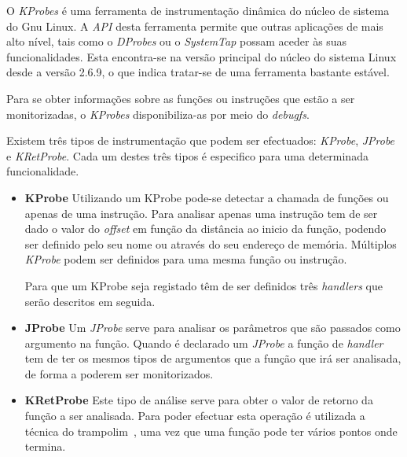 O \textit{KProbes} é uma ferramenta de instrumentação dinâmica do núcleo de sistema do Gnu Linux. A \textit{API} desta ferramenta permite que outras aplicações de mais alto nível, tais como o \textit{DProbes} ou o \textit{SystemTap} possam aceder às suas funcionalidades. Esta encontra-se na versão principal do núcleo do sistema Linux desde a versão 2.6.9, o que indica tratar-se de uma ferramenta bastante estável\cite{kernel_debug_printk_on_fly,KProbesSite}.


Para se obter informações sobre as funções ou instruções que estão a ser monitorizadas, o \textit{KProbes} disponibiliza-as por meio do \textit{debugfs}.

Existem três tipos de instrumentação que podem ser efectuados: \textit{KProbe}, \textit{JProbe} e \textit{KRetProbe}. Cada um destes três tipos é especifico para uma determinada funcionalidade.

\begin{itemize}
 \item \textbf{KProbe}
Utilizando um KProbe pode-se detectar a chamada de funções ou apenas de uma instrução. Para analisar apenas uma instrução tem de ser dado o valor do \textit{offset} em função da distância ao inicio da função, podendo ser definido pelo seu nome ou através do seu endereço de memória. Múltiplos \textit{KProbe} podem ser definidos para uma mesma função ou instrução.

Para que um KProbe seja registado têm de ser definidos três \textit{handlers} que serão descritos em seguida.

\item \textbf{JProbe}
Um \textit{JProbe} serve para analisar os parâmetros que são passados como argumento na função. Quando é declarado um \textit{JProbe} a função de \textit{handler} tem de ter os mesmos tipos de argumentos que a função que irá ser analisada, de forma a poderem ser monitorizados.
 

 \item \textbf{KRetProbe}
  Este tipo de análise serve para obter o valor de retorno da função a ser analisada. Para poder efectuar esta operação
é utilizada a técnica do trampolim~\cite{Hollingsworth94dynamicprogram}, uma vez que uma função pode ter vários pontos onde termina.


\end{itemize}


